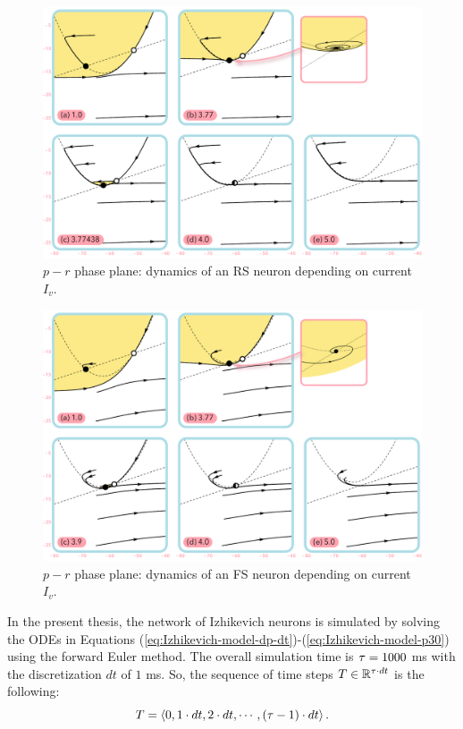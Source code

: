 \begin{figure}[!htp]
    \centering
    \includegraphics[width=\textwidth]{src/assets/images/neural-dynamics/nd-rs.pdf}
    \caption[Dynamics of an RS neuron]{$p-r$ phase plane: dynamics of an RS neuron depending on current $I_v$.}
    \label{fig:neural-dynamics-rs}
\end{figure}

\begin{figure}[!htp]
    \centering
    \includegraphics[width=\textwidth]{src/assets/images/neural-dynamics/nd-fs.pdf}
    \caption[Dynamics of an FS neuron]{$p-r$ phase plane: dynamics of an FS neuron depending on current $I_v$.}
    \label{fig:neural-dynamics-fs}
\end{figure}


In the present thesis, the network of Izhikevich neurons is simulated by solving the ODEs in Equations (\ref{eq:Izhikevich-model-dp-dt})-(\ref{eq:Izhikevich-model-p30}) using the forward Euler method. The overall simulation time is $\tau = 1000$ ms with the discretization $dt$ of $1$ ms. So, the sequence of time steps $T \in \mathbb{R}^{\tau \cdot dt}$ is the following:
\begin{equation}
    T = \left<
        0, 1 \cdot dt, 2 \cdot dt, \cdots, (\tau-1) \cdot dt
    \right>.
\end{equation}

